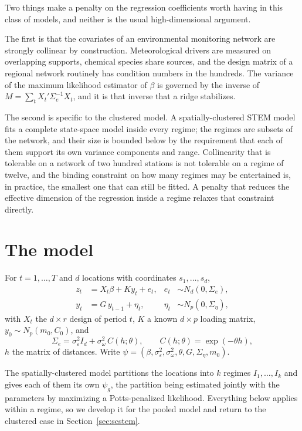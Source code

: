 \documentclass[11pt,a4paper]{article}
\newcommand{\Sig}{\Sigma}
\newcommand{\Se}{\Sig_{e}}
\begin{document}
Two things make a penalty on the regression coefficients worth having in this
class of models, and neither is the usual high-dimensional argument.

The first is that the covariates of an environmental monitoring network are
strongly collinear by construction. Meteorological drivers are measured on
overlapping supports, chemical species share sources, and the design matrix of a
regional network routinely has condition numbers in the hundreds. The variance
of the maximum likelihood estimator of $\beta$ is governed by the inverse of
$M = \sum_t X_t'\Se^{-1}X_t$, and it is that inverse that a ridge stabilizes.

The second is specific to the clustered model. A spatially-clustered STEM model
fits a complete state-space model inside every regime; the regimes are subsets
of the network, and their size is bounded below by the requirement that each of
them support its own variance components and range. Collinearity that is
tolerable on a network of two hundred stations is not tolerable on a regime of
twelve, and the binding constraint on how many regimes may be entertained is,
in practice, the smallest one that can still be fitted. A penalty that reduces
the effective dimension of the regression inside a regime relaxes that
constraint directly.

\section{The model}

For $t = 1,\dots,T$ and $d$ locations with coordinates $s_1,\dots,s_d$,
\begin{align}
  z_t &= X_t\beta + K y_t + e_t, & e_t &\sim N_d(0,\Se), \label{eq:meas}\\
  y_t &= G\,y_{t-1} + \eta_t,    & \eta_t &\sim N_p(0,\Sig_\eta),
  \label{eq:state}
\end{align}
with $X_t$ the $d\times r$ design of period $t$, $K$ a known $d\times p$
loading matrix, $y_0 \sim N_p(m_0, C_0)$, and
\begin{equation}
  \Se = \sigma^2_\varepsilon I_d + \sigma^2_\omega\, C(h;\theta),
  \qquad C(h;\theta) = \exp(-\theta h),
  \label{eq:cov}
\end{equation}
$h$ the matrix of distances. Write
$\psi = (\beta,\sigma^2_\varepsilon,\sigma^2_\omega,\theta,G,\Sig_\eta,m_0)$.

The spatially-clustered model partitions the locations into $k$ regimes
$I_1,\dots,I_k$ and gives each of them its own $\psi_g$, the partition being
estimated jointly with the parameters by maximizing a Potts-penalized
likelihood. Everything below applies within a regime, so we develop it for the
pooled model and return to the clustered case in Section~\ref{sec:scstem}.
\end{document}
